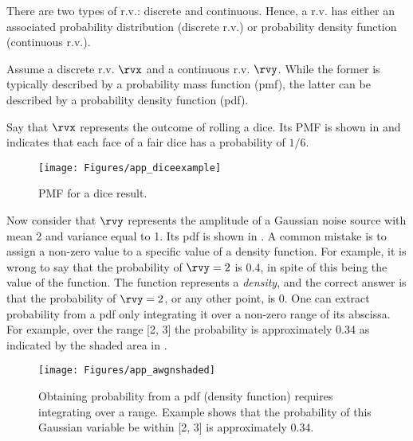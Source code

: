 There are two types of r.v.: discrete and continuous. Hence, a r.v. has either an associated probability distribution (discrete r.v.) or probability density function (continuous r.v.).

Assume a discrete r.v. $\rvx$ and a continuous r.v. $\rvy$. While the former is typically described by a probability mass function (pmf), the latter can be described by a probability density function (pdf).

Say that $\rvx$ represents the outcome of rolling a dice. Its PMF is shown in  and indicates that each face of a fair dice has a probability of $1/6$.

\begin{figure}[htbp]
	\centering
		\texttt{[image: Figures/app\_diceexample]}		
	\caption{PMF for a dice result.\label{fig:app_diceexample}}
\end{figure}

Now consider that $\rvy$ represents the amplitude of a Gaussian noise source with mean 2 and variance equal to 1. Its pdf is shown in . A common mistake is to assign a non-zero value to a specific value of a density function.
For example, it is wrong to say that the probability of $\rvy = 2$ is $0.4$, in spite of this being the value of the function. The function represents a \emph{density}, and the correct answer is that the probability of $\rvy = 2$, or any other point, is 0. One can extract probability from a pdf only integrating it over a non-zero range of its abscissa. For example, over the range [2, 3] the probability is approximately 0.34 as indicated by the shaded area in .


\begin{figure}[htbp]
	\centering
		\texttt{[image: Figures/app\_awgnshaded]}		
	\caption[{Obtaining probability from a pdf (density function) requires integrating over a range.}]{Obtaining probability from a pdf (density function) requires integrating over a range. Example shows that the probability of this Gaussian variable be within [2, 3] is approximately 0.34.\label{fig:app_awgnshaded}}
\end{figure}

